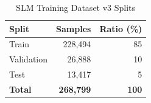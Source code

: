 \begin{table}[htbp]
\centering
\caption{SLM Training Dataset v3 Splits}
\label{tab:dataset-splits}
\begin{tabular}{@{}lrr@{}}
\toprule
\textbf{Split} & \textbf{Samples} & \textbf{Ratio (\%)} \\
\midrule
Train      & 228,494 & 85 \\
Validation &  26,888 & 10 \\
Test       &  13,417 &  5 \\
\midrule
\textbf{Total} & \textbf{268,799} & \textbf{100} \\
\bottomrule
\end{tabular}
\end{table}